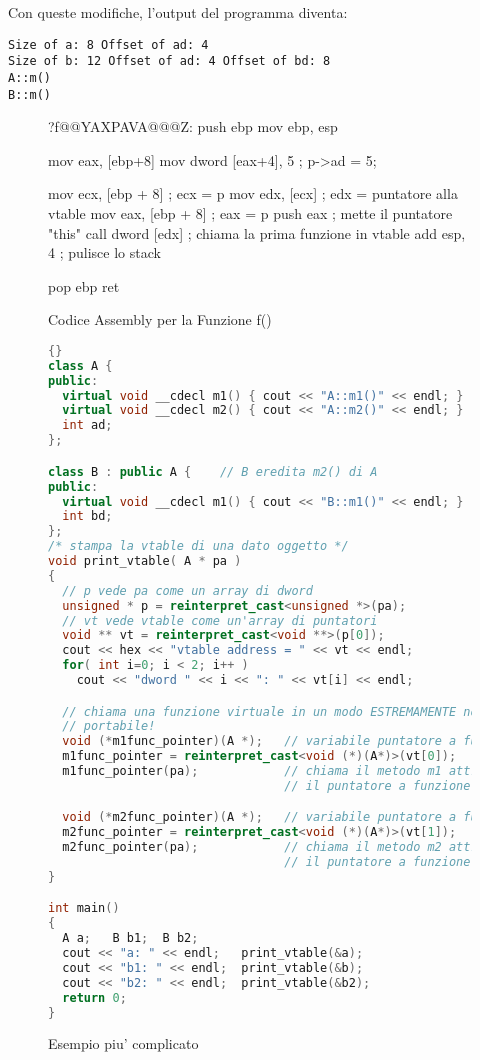 Con queste modifiche, l'output del programma diventa:
\begin{verbatim}
Size of a: 8 Offset of ad: 4
Size of b: 12 Offset of ad: 4 Offset of bd: 8
A::m()
B::m()
\end{verbatim}


\begin{figure}[tp]
\begin{AsmCodeListing}[commentchar=!]
?f@@YAXPAVA@@@Z:
      push   ebp
      mov    ebp, esp

      mov    eax, [ebp+8]
      mov    dword [eax+4], 5  ; p->ad = 5;

      mov    ecx, [ebp + 8]    ; ecx = p
      mov    edx, [ecx]        ; edx = puntatore alla vtable
      mov    eax, [ebp + 8]    ; eax = p
      push   eax               ; mette il puntatore "this"
      call   dword [edx]       ; chiama la prima funzione in vtable
      add    esp, 4            ; pulisce lo stack

      pop    ebp
      ret
\end{AsmCodeListing}
\caption{Codice Assembly per la Funzione {\code f()} \label{fig:FAsm2}}
\end{figure}

\begin{figure}[tp]
\begin{lstlisting}[language=C++, frame=tlrb]{}
class A {
public:
  virtual void __cdecl m1() { cout << "A::m1()" << endl; }
  virtual void __cdecl m2() { cout << "A::m2()" << endl; }
  int ad;
};

class B : public A {    // B eredita m2() di A
public:
  virtual void __cdecl m1() { cout << "B::m1()" << endl; }
  int bd;
};
/* stampa la vtable di una dato oggetto */
void print_vtable( A * pa )
{
  // p vede pa come un array di dword
  unsigned * p = reinterpret_cast<unsigned *>(pa);
  // vt vede vtable come un'array di puntatori
  void ** vt = reinterpret_cast<void **>(p[0]);
  cout << hex << "vtable address = " << vt << endl;
  for( int i=0; i < 2; i++ )
    cout << "dword " << i << ": " << vt[i] << endl;

  // chiama una funzione virtuale in un modo ESTREMAMENTE non 
  // portabile!
  void (*m1func_pointer)(A *);   // variabile puntatore a funzione
  m1func_pointer = reinterpret_cast<void (*)(A*)>(vt[0]);
  m1func_pointer(pa);            // chiama il metodo m1 attraverso
                                 // il puntatore a funzione

  void (*m2func_pointer)(A *);   // variabile puntatore a funzione
  m2func_pointer = reinterpret_cast<void (*)(A*)>(vt[1]);
  m2func_pointer(pa);            // chiama il metodo m2 attraverso
                                 // il puntatore a funzione
}

int main()
{
  A a;   B b1;  B b2;
  cout << "a: " << endl;   print_vtable(&a);
  cout << "b1: " << endl;  print_vtable(&b);
  cout << "b2: " << endl;  print_vtable(&b2);
  return 0;
}
\end{lstlisting}
\caption{ Esempio piu' complicato \label{fig:2mEx}}
\end{figure}



